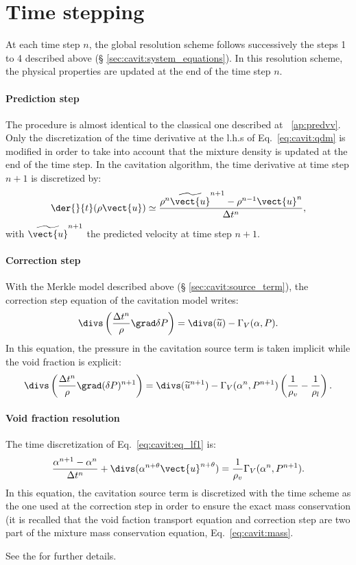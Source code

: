 \section{Time stepping}\label{sec:cavit:time_stepping}
At each time step $n$, the global resolution scheme follows successively
the steps 1 to 4 described above (\S
\ref{sec:cavit:system_equations}). In this resolution scheme, the physical
properties are updated at the end of the time step $n$.

\paragraph{Prediction step} The procedure is almost identical to the
classical one described at \appendixname~\ref{ap:predvv}. Only the
discretization of the time derivative at the l.h.s of
Eq.~\eqref{eq:cavit:qdm} is modified in order to take into account that the
mixture density is updated at the end of the time step. In the
cavitation algorithm, the time derivative at time step $n+1$ is
discretized by:
\begin{equation*}
\der{}{
t}(\rho\vect{u})\simeq \frac{\rho^n\widetilde{\vect{u}}^{n+1}-\rho^{n-1}\vect{u}^n}{\Delta t^n},
\end{equation*}
%
with $\widetilde{\vect{u}}^{n+1}$ the predicted velocity at time step
$n+1$.
%
\paragraph{Correction step}
With the Merkle model described above (\S
\ref{sec:cavit:source_term}), the correction step equation of the
cavitation model writes:
\begin{equation*}
\divs\left(\frac{\Delta t^n}{\rho}\grad\delta P\right) =
\divs(\widetilde{u})-\Gamma_V(\alpha,P).
\end{equation*}
In this equation, the pressure in the cavitation source term is taken
implicit while the void fraction is explicit:
\begin{equation*}
\divs\left(\frac{\Delta t^n}{\rho}\grad(\delta P)^{n+1}\right) =
\divs(\widetilde{u}^{n+1})-\Gamma_V(\alpha^n,P^{n+1})\left(\frac{1}{\rho_v}-\frac{1}{\rho_l}\right).
\end{equation*}
%
\paragraph{Void fraction resolution}
The time discretization of Eq.~\eqref{eq:cavit:eq_lf1} is:
\begin{equation}\label{eq:cavit:eq_vf_dis}
\frac{\alpha^{n+1}-\alpha^n}{\Delta t^n}+\divs(\alpha^{n+\theta}\vect{u}^{n+\theta}) =
\frac{1}{\rho_v}\Gamma_V(\alpha^n,P^{n+1}).
\end{equation}
In this equation, the cavitation source term is discretized with the
time scheme as the one used at the correction step in order to
ensure the exact mass conservation (it is recalled that the void
faction transport equation and correction step are two part of the
mixture mass conservation equation, Eq.~\eqref{eq:cavit:mass}.

See the 
for further details.

%
